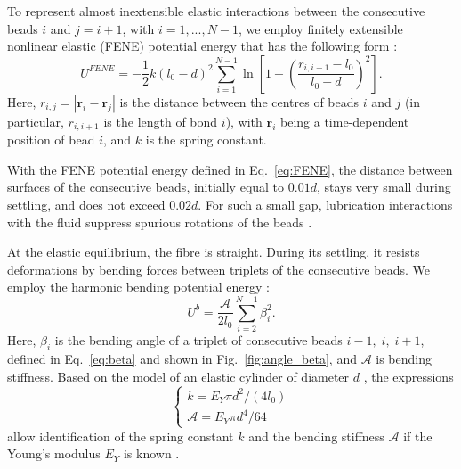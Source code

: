 \documentclass{article}
\begin{document}
To represent almost inextensible elastic interactions between the consecutive beads $i$ and $j= i+1$, with $i=1,...,N-1$,  %
we employ finitely extensible nonlinear elastic (FENE) potential energy %
that has the following form \cite{warner_kinetic_1972, bird_dynamics_1977}:
\begin{equation}
\label{eq:FENE}
U^{FENE} = - \frac{1}{2} k (l_{0}-d)^{2} \sum_{i=1}^{N-1}\ln\left[ {1 - \left(\frac{r_{i,i+1}-l_{0}}{l_{0}-d} \right)^{2}} \right]. %
\end{equation}
Here, 
  $r_{i,j}=|\bm{r}_i-\bm{r}_j|$ is the distance between the centres of beads $i$ and $j$ (in particular, $r_{i,i+1}$ is the %
  length of bond $i$), %
  with
  $\bm{r}_{i}$ being a time-dependent position of bead $i$,
  and
  $k$ is the spring constant.

With the FENE potential energy defined in Eq.~\ref{eq:FENE}, %
the distance between surfaces of the consecutive beads, initially equal to $0.01d$, stays very small during settling, and does not exceed $0.02 d$. For such a %
small gap, lubrication interactions with the fluid suppress %
spurious rotations of the beads \cite{slowicka2015}. 

At the elastic equilibrium, the fibre is straight. 
During its settling, it resists deformations by bending
forces between triplets of the consecutive beads. %
We employ the harmonic bending potential energy \cite{storm_theory_2003, li_viscoelasticity_2012, bukowicki2018different, gruziel_periodic_2018, gruziel2019stokesian}: %
\begin{equation}
\label{eq:BEND}
   U^{b} =  \frac{\mathcal{A}}{2 l_{0}}  \sum_{i=2}^{N-1} %
   \beta_{i} %
   ^{2}.
\end{equation}
Here, 
 $\beta_{i}$ is the bending angle of a triplet of consecutive beads $i-1,\;i,\;i+1$, defined in Eq.~\ref{eq:beta} and shown in Fig.~\ref{fig:angle_beta}, 
and
 $\mathcal{A}$ is bending stiffness.
Based on the model of an elastic cylinder of diameter $d$ \cite{landau_1986}, the expressions
\begin{equation}
  \begin{cases}
   k = E_{Y} \pi d^2 / \left( 4 l_{0} \right) \\
   \mathcal{A} = E_{Y} \pi d^4 /  64 
  \end{cases}
\end{equation}
allow identification of the spring constant $k$ and the bending stiffness $\mathcal{A}$ if the Young's modulus $E_{Y}$ is known \cite{bukowicki2018different}.
\end{document}
